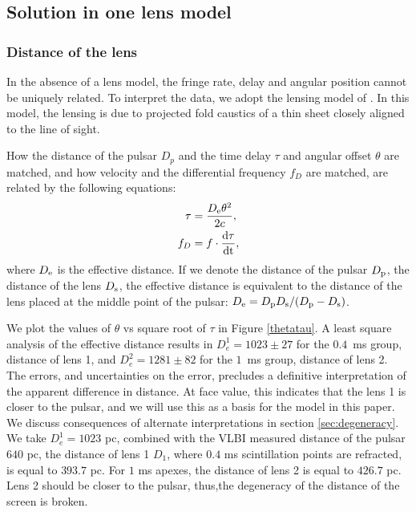 \documentclass[useAMS,usenatbib]{mn2e}
\begin{document}
\subsection{Solution in one lens model}
\subsubsection{Distance of the lens}
In the absence of a lens model, the
fringe rate, delay and angular position cannot be uniquely related. To interpret the data, we adopt the lensing model of
\citep{2014MNRAS.442.3338P}.  In this model, the lensing is due to projected fold caustics of a thin sheet closely aligned to the line of sight. 

How the distance of the pulsar $D_p$ and the time delay $\tau$ and angular offset $\theta$ are matched, and how velocity and the differential frequency $f_D$ are matched, are related by the following equations:
\begin{equation}
\begin{aligned}
\tau &=\frac{D_{\rm e}{\theta}^2}{2c}, \\
f_D  &=f\cdot\frac{\rm d\tau}{\rm dt},
\end{aligned} 
\end{equation}
where ${D_{\rm e}}$ is the effective distance. If we denote the distance of the pulsar $D_{\rm p}$, the distance of the lens $D_{\rm s}$, the effective distance is equivalent to the distance of the lens placed at the middle point of the pulsar: $D_{\rm e}={D_{\rm p} D_{\rm s}}/({D_{\rm p} - D_{\rm s}})$. 

We plot the values of $\theta$ vs square root of $\tau$ in Figure \ref{thetatau}. A least square analysis of the effective distance results in
$D_e^1=1023\pm 27$ for the  $0.4$\ ms group, distance of lens 1, and
$D_e^2 = 1281 \pm 82$ for the $1$\ ms group, distance of lens 2.
The errors, and uncertainties on the error, precludes a definitive
interpretation of the apparent difference in distance.  At face value, 
this indicates that the lens 1 is closer to the pulsar, and we will
use this as a basis for the model in this paper.  We discuss
consequences of alternate interpretations in section \ref{sec:degeneracy}.
We take $D_e^1=1023$ pc, combined with the VLBI measured distance of the pulsar $640$ pc, the distance of lens 1 $D_{1}$, where $0.4$ ms scintillation points are refracted, is equal to $393.7$ pc. For $1$ ms apexes, the distance of lens 2 is equal to $426.7$ pc. Lens 2 should be closer to the pulsar, thus,the degeneracy of the distance of the screen is broken.
\end{document}
